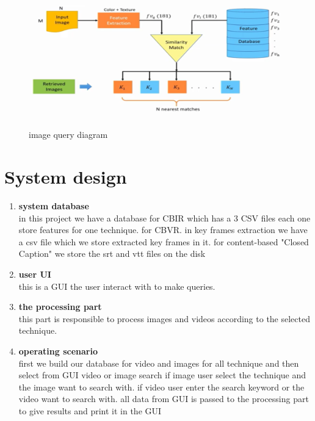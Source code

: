 \documentclass[pdftex,10pt,a4paper,oneside]{article}
\begin{document}
\begin{figure}[H]
	\centering
	\includegraphics[width=120mm,height=60mm]{fig/20.png}
	\caption{image query diagram }
	\label{image query diagram}
\end{figure}
	\pagebreak
	\section{System design}
	\begin{enumerate}
		\item  \textbf{{\large system database}}\\
		in this project we have a database for CBIR which has a 3 CSV files each one store features for one technique.
		for CBVR. in key frames extraction we have a csv file which we store extracted key frames in it. for content-based "Closed Caption" we store the srt and vtt files on the disk
		
		\item \textbf{{\large user UI}} \\
		this is a GUI the user interact with to make queries.
		\item \textbf{{\large the processing part}}\\
		this part is responsible to process images and videos according to the selected technique.
		\item \textbf{{\large  operating scenario}}\\
		 first we build our database for video and images for all technique and then select from GUI video or image search if image user select the technique and the image want to search with. if video user enter the search keyword or the video want to search with. all data from GUI is passed to the processing part to give results and print it in the GUI  
		
	\end{enumerate}
	
	
	 
\end{document}
